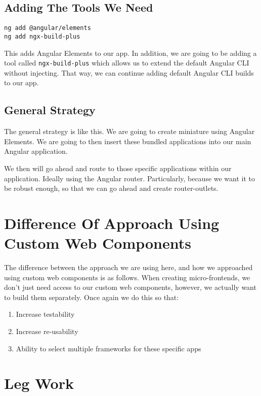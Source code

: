 \subsection{Adding The Tools We Need}
\begin{verbatim}
ng add @angular/elements
ng add ngx-build-plus
\end{verbatim}

This adds Angular Elements to our app. In addition, we are going to be adding a tool called \lstinline{ngx-build-plus} which allows us to extend the default Angular CLI without injecting. That way, we can continue adding default Angular CLI builds to our app. 

\subsection{General Strategy}
The general strategy is like this. We are going to create miniature using Angular Elements. We are going to then insert these bundled applications into our main Angular application. 

We then will go ahead and route to those specific applications within our application. Ideally using the Angular router. Particularly, because we want it to be robust enough, so that we can go ahead and create router-outlets. 

\section{Difference Of Approach Using Custom Web Components}
The difference between the approach we are using here, and how we approached using custom web components is as follows. When creating micro-frontends, we don't just need access to our custom web components, however, we actually want to build them separately. Once again we do this so that: 
\begin{enumerate}
  \item Increase testability
  \item Increase re-usability
  \item Ability to select multiple frameworks for these specific apps
\end{enumerate}

\section{Leg Work}
